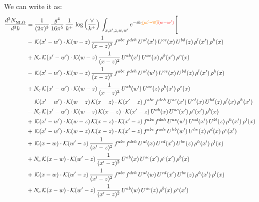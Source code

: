 \documentclass[9pt]{article}
\numberwithin{equation}{section}
\begin{document}
We can write it as: 
\begin{align}
    \frac{d^{3}N_{\rm NLO}^{\rm}}{d^{3}k}  & = \frac{1}{(2\pi)^{3}}\,\frac{g^{4}}{16\pi^{5}}\,\frac{1}{k^{+}}\,\log{\left(\frac{\vee}{k^{+}}\right)}\, \int_{x,x',z,w,w'}e^{-ik\cdot{\color{orange}\cancel{(w'-w)}}{\color{red}(w-w')}}\Bigg[\notag\\ &
    -\,\mathcal{K}(x'-w')\cdot\mathcal{K}(w-z)\,\frac{1}{(x-z)^{2}}\,f^{abc}\,f^{deh}\,U^{al}(x')\,U^{ce}(x)\,U^{bd}(z)\,\rho^{l}(x')\,\rho^{h}(x)\notag \\ 
&+N_{c}\,\mathcal{K}(x'-w')\cdot\mathcal{K}(w-z)\,\frac{1}{(x-z)^{2}}\,U^{ab}(x')\,U^{ac}(x)\,\rho^{b}(x')\,\rho^{c}(x)\notag \\ 
&-\,\mathcal{K}(x'-w')\cdot\mathcal{K}(w-z)\,\frac{1}{(x-z)^{2}}\,f^{abc}\,f^{deh}\,U^{al}(w')\,U^{ce}(x)\,U^{bd}(z)\,\rho^{l}(x')\,\rho^{h}(x)\notag \\ 
&+N_{c}\,\mathcal{K}(x'-w')\cdot\mathcal{K}(w-z)\,\frac{1}{(x-z)^{2}}\,U^{ab}(w')\,U^{ac}(z)\,\rho^{b}(x')\,\rho^{c}(x)\notag \\ 
&-\,\mathcal{K}(x'-w')\cdot\mathcal{K}(w-z)\,\mathcal{K}(x-z)\cdot\mathcal{K}(x'-z)\,f^{abc}\,f^{deh}\,U^{ae}(x')\,U^{cl}(x)\,U^{bd}(z)\,\rho^{l}(x)\,\rho^{h}(x')\notag \\ 
&-N_{c}\,\mathcal{K}(x'-w')\cdot\mathcal{K}(w-z)\,\mathcal{K}(x-z)\cdot\mathcal{K}(x'-z)\,U^{ab}(x)\,U^{ac}(x')\,\rho^{c}(x')\,\rho^{b}(x)\notag \\ 
&+\,\mathcal{K}(x'-w')\cdot\mathcal{K}(w-z)\,\mathcal{K}(x-z)\cdot\mathcal{K}(x'-z)\,f^{abc}\,f^{deh}\,U^{ae}(w')\,U^{cd}(x')\,U^{bl}(z)\,\rho^{h}(x')\,\rho^{l}(x)\notag \\ 
&+\,\mathcal{K}(x'-w')\cdot\mathcal{K}(w-z)\,\mathcal{K}(x-z)\cdot\mathcal{K}(x'-z)\,f^{abc}\,f^{ade}\,U^{hb}(w')\,U^{he}(z)\,\rho^{d}(x)\,\rho^{c}(x')\notag \\ 
&+\,\mathcal{K}(x-w)\cdot\mathcal{K}(w'-z)\,\frac{1}{(x'-z)^{2}}\,f^{abc}\,f^{deh}\,U^{al}(x)\,U^{cd}(x')\,U^{be}(z)\,\rho^{h}(x')\,\rho^{l}(x)\notag \\ 
&+N_{c}\,\mathcal{K}(x-w)\cdot\mathcal{K}(w'-z)\,\frac{1}{(x'-z)^{2}}\,U^{ab}(x)\,U^{ac}(x')\,\rho^{c}(x')\,\rho^{b}(x)\notag \\ 
&+\,\mathcal{K}(x-w)\cdot\mathcal{K}(w'-z)\,\frac{1}{(x'-z)^{2}}\,f^{abc}\,f^{deh}\,U^{al}(w)\,U^{cd}(x')\,U^{be}(z)\,\rho^{h}(x')\,\rho^{l}(x)\notag \\ 
&+N_{c}\,\mathcal{K}(x-w)\cdot\mathcal{K}(w'-z)\,\frac{1}{(x'-z)^{2}}\,U^{ab}(w)\,U^{ac}(z)\,\rho^{b}(x)\,\rho^{c}(x')\notag \\ 

\end{align}
\end{document}
